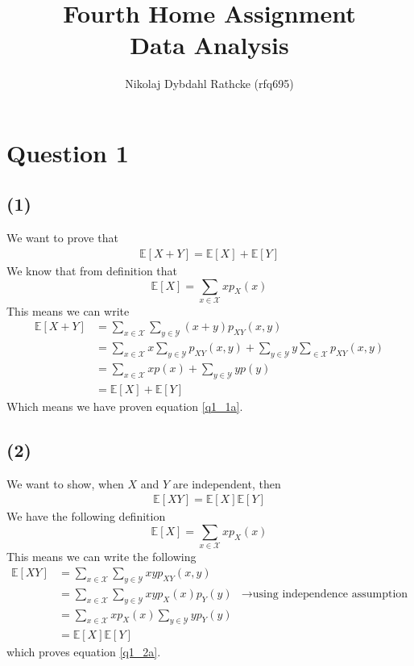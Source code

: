 \documentclass[a4paper]{article}
\author{Nikolaj Dybdahl Rathcke (rfq695)}
\title{Fourth Home Assignment \\ Data Analysis}
\begin{document}
\maketitle
\section*{Question 1}
\subsection*{(1)}
We want to prove that
\begin{align}
\mathbb{E}[X+Y]=\mathbb{E}[X]+\mathbb{E}[Y]
\label{q1_1a}
\end{align}
We know that from definition that
$$\mathbb{E}[X]=\sum_{x\in \mathcal{X}}xp_X(x)$$
This means we can write
\begin{align*}
\mathbb{E}[X+Y] &=\sum_{x\in \mathcal{X}}\sum_{y\in \mathcal{Y}} (x+y)p_{XY}(x,y)\\
                &= \sum_{x\in \mathcal{X}}x\sum_{y\in \mathcal{Y}} p_{XY}(x,y)+ \sum_{y\in \mathcal{Y}}y\sum_{\in \mathcal{X}} p_{XY}(x,y)\\
                &= \sum_{x\in \mathcal{X}}xp(x)+\sum_{y\in \mathcal{Y}}yp(y) \\
                &= \mathbb{E}[X]+\mathbb{E}[Y]
\end{align*}
Which means we have proven equation \ref{q1_1a}.
\subsection*{(2)}
We want to show, when $X$ and $Y$ are independent, then
\begin{align}
\mathbb{E}[XY]=\mathbb{E}[X]\mathbb{E}[Y]
\label{q1_2a}
\end{align}
We have the following definition
$$\mathbb{E}[X]=\sum_{x\in \mathcal{X}}xp_X(x)$$
This means we can write the following
\begin{align*}
\mathbb{E}[XY]           &= \sum_{x\in \mathcal{X}}\sum_{y\in \mathcal{Y}} xy p_{XY}(x,y)\\
&= \sum_{x\in \mathcal{X}}\sum_{y\in \mathcal{Y}} xyp_{X}(x)p_{Y}(y) &\rightarrow\mbox{using independence assumption} \\
                         &= \sum_{x\in \mathcal{X}}xp_{X}(x)\sum_{y\in \mathcal{Y}} yp_{Y}(y) \\
                         &= \mathbb{E}[X]\mathbb{E}[Y]
\end{align*}
which proves equation \ref{q1_2a}.
\end{document}

